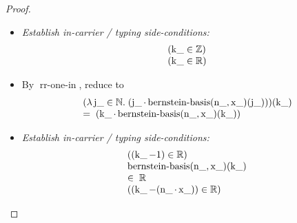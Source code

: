 \documentclass[11pt]{article}
\theoremstyle{plain}
\begin{document}
\begin{proof}
\begin{itemize}[leftmargin=2.8em, itemsep=4pt, parsep=1pt]
  \item[\textbf{131--133}] \emph{Establish in-carrier / typing side-conditions:}
\begin{equation*}
\begin{array}{@{}l@{}}
(\operatorname{k\_} \in \mathbb{Z}) \\
(\operatorname{k\_} \in \mathbb{R})
\end{array}
\end{equation*}

  \item[\textbf{134}] By $\operatorname{rr\text{-}one\text{-}in}$, reduce to
\begin{equation*}
\begin{array}{@{}l@{}} (\lambda \operatorname{j\_} \in \mathbb{N}.\; (\operatorname{j\_} \cdot \operatorname{bernstein\text{-}basis}(\operatorname{n\_}, \operatorname{x\_})(\operatorname{j\_})))(\operatorname{k\_}) \\ =\; (\operatorname{k\_} \cdot \operatorname{bernstein\text{-}basis}(\operatorname{n\_}, \operatorname{x\_})(\operatorname{k\_})) \end{array}
\end{equation*}

  \item[\textbf{135--137}] \emph{Establish in-carrier / typing side-conditions:}
\begin{equation*}
\begin{array}{@{}l@{}}
((\operatorname{k\_} - 1) \in \mathbb{R}) \\
\begin{array}{@{}l@{}} \operatorname{bernstein\text{-}basis}(\operatorname{n\_}, \operatorname{x\_})(\operatorname{k\_}) \\ \in\; \mathbb{R} \end{array} \\
((\operatorname{k\_} - (\operatorname{n\_} \cdot \operatorname{x\_})) \in \mathbb{R})
\end{array}
\end{equation*}


\end{itemize}
\end{proof}
\end{document}
